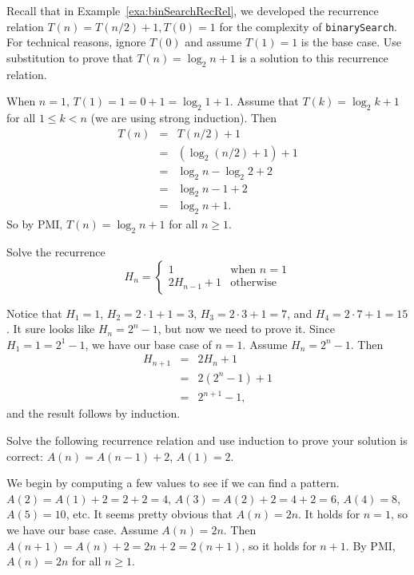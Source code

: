 \begin{exer}
Recall that in Example~\ref{exa:binSearchRecRel}, we
developed the recurrence relation $T(n)=T(n/2)+1, T(0)=1$ for the complexity of \verb+binarySearch+.
For technical reasons, ignore $T(0)$ and assume $T(1)=1$ is the base case.
Use substitution to prove that $T(n)=\log_2 n + 1$ is a solution to this 
recurrence relation.

\vspace*{2.5in}
\begin{answer}
When $n=1$, $T(1)=1=0+1=\log_2 1 + 1$.
Assume that $T(k)=\log_2 k + 1$ for all $1\leq k <n$ 
(we are using strong induction).
Then 
\begin{eqnarray*}
T(n)&=&T(n/2)+1\\
&=&(\log_2 (n/2) + 1) + 1\\
&=&\log_2 n - \log_2 2 + 2\\
&=&\log_2 n - 1 + 2\\
&=&\log_2 n +1.
\end{eqnarray*}
So by PMI, $T(n)=\log_2 n + 1$ for all $n\geq 1$.
\end{answer}
\end{exer}

\begin{exa}\label{exa:Hanoi1}
Solve the recurrence
$$
H_n = \left\{ 
\begin{array}{ll}
1&\mbox{when $n = 1$}\\
2 H_{n-1} + 1 & \mbox{otherwise}
\end{array}
\right.
$$
\begin{pf}
Notice that $H_1=1$, $H_2=2\cdot 1 + 1 = 3$, $H_3=2\cdot 3+1 = 7$, and $H_4=2\cdot 7 + 1=15$.
It sure looks like $H_n=2^n-1$,  but now we need to prove it.  
Since $H_1=1=2^1-1$, we have our base case of $n=1$.  Assume $H_n=2^n-1$.  Then
\begin{eqnarray*}
H_{n+1}&=&2H_n+1\\
&=&2(2^n-1)+1\\
&=&2^{n+1}-1,
\end{eqnarray*}
and the result follows by induction.
\end{pf}
\end{exa}

\begin{exer}
Solve the following recurrence relation and use induction to prove
your solution is correct:  $A(n)=A(n-1)+2$, $A(1)=2$.

\vspace*{4.5in}
\begin{answer}
We begin by computing a few values to see if we can find a pattern.
$A(2)=A(1)+2 = 2+2= 4$, $A(3)=A(2)+2=4+2=6$, $A(4)=8$, $A(5)=10$, etc.
It seems pretty obvious that $A(n)=2n$.  It holds for $n=1$, so we have our base case.
Assume $A(n)=2n$.  Then $A(n+1)=A(n)+2 = 2n+2=2(n+1)$, so it holds for $n+1$.
By PMI, $A(n)=2n$ for all $n\geq 1$.
\end{answer}
\end{exer}

